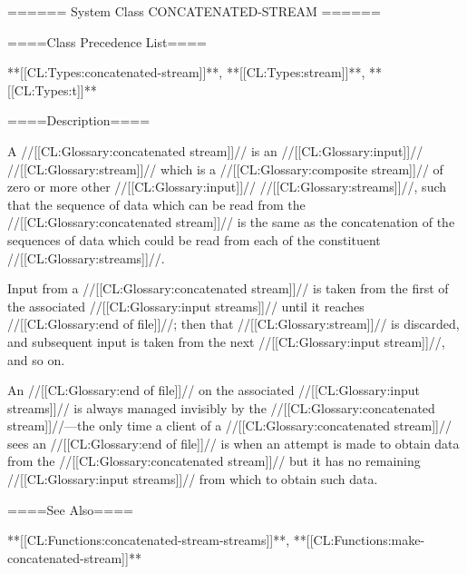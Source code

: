 ====== System Class CONCATENATED-STREAM ======

====Class Precedence List====

**[[CL:Types:concatenated-stream]]**, **[[CL:Types:stream]]**, **[[CL:Types:t]]**

====Description====

A //[[CL:Glossary:concatenated stream]]// is an //[[CL:Glossary:input]]// //[[CL:Glossary:stream]]// which is a //[[CL:Glossary:composite stream]]// of zero or more other //[[CL:Glossary:input]]// //[[CL:Glossary:streams]]//, such that the sequence of data which can be read from the //[[CL:Glossary:concatenated stream]]// is the same as the concatenation of the sequences of data which could be read from each of the constituent //[[CL:Glossary:streams]]//.

Input from a //[[CL:Glossary:concatenated stream]]// is taken from the first of the associated //[[CL:Glossary:input streams]]// until it reaches //[[CL:Glossary:end of file]]//; then that //[[CL:Glossary:stream]]// is discarded, and subsequent input is taken from the next //[[CL:Glossary:input stream]]//, and so on.

An //[[CL:Glossary:end of file]]// on the associated //[[CL:Glossary:input streams]]// is always managed invisibly by the //[[CL:Glossary:concatenated stream]]//---the only time a client of a //[[CL:Glossary:concatenated stream]]// sees an //[[CL:Glossary:end of file]]// is when an attempt is made to obtain data from the //[[CL:Glossary:concatenated stream]]// but it has no remaining //[[CL:Glossary:input streams]]// from which to obtain such data.

====See Also====

**[[CL:Functions:concatenated-stream-streams]]**, **[[CL:Functions:make-concatenated-stream]]**

 

